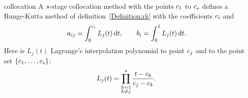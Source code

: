 \begin{Lemma}{collocation}
  A $s$-stage collocation method with the points $c_1$
  to $c_s$ defines a Runge-Kutta method of
  definition~\ref{Definition:rk} with the coefficients $c_i$ and
  \begin{gather}
  \label{eq:implicit:kolkoef}
    a_{ij} =  \int_0^{c_i} L_j(t)\, \mathrm{d} t,
    \qquad
    b_i =\int_0^1 L_j(t)\, \mathrm{d} t.
  \end{gather}
  Here is $L_j(t)$ Lagrange's interpolation polynomial to point $c_j$
  and to the point set $\{c_1,\dots,c_s\}$:
  \begin{gather*}
    L_j(t) = \prod_{\substack{k=1\\k\neq j}}^s \frac{t-c_k}{c_j-c_k}.
  \end{gather*}
\end{Lemma}

